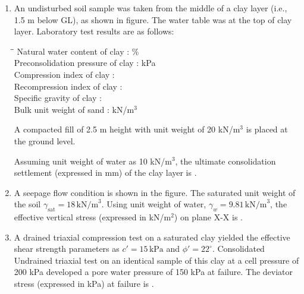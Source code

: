 \documentclass[journal]{IEEEtran}
\begin{document}
\begin{enumerate}[start=40]
\item An undisturbed soil sample was taken from the middle of a clay layer (i.e., 1.5 m below GL), as shown in figure. The water table was at the top of clay layer. Laboratory test results are as follows:\\
\begin{flushleft}
    \begin{tabbing}
        \hspace*{3cm}\=\hspace*{4cm}\=\kill
        Natural water content of clay \> : \% \\
        Preconsolidation pressure of clay \> :  kPa \\
        Compression index of clay \> :  \\
        Recompression index of clay \> :  \\
        Specific gravity of clay \> :  \\
        Bulk unit weight of sand \> :  kN/m$^3$ \\
    \end{tabbing}
\end{flushleft}A compacted fill of 2.5 m height with unit weight of 20 kN/m$^3$ is placed at the ground level.



 Assuming unit weight of water as 10 kN/m$^3$, the ultimate consolidation settlement (expressed in mm) of the clay layer is \underline{\hspace{3cm}}.\\
\item A seepage flow condition is shown in the figure. The saturated unit weight of the soil $\gamma_{\text{sat}} = 18 \, \text{kN/m}^3$. Using unit weight of water, $\gamma_w = 9.81 \, \text{kN/m}^3$, the effective vertical stress (expressed in kN/m$^2$) on plane X-X is \underline{\hspace{2cm}}.\\


\item A drained triaxial compression test on a saturated clay yielded the effective shear strength parameters as $c' = 15 \, \text{kPa}$ and $\phi' = 22^\circ$. Consolidated Undrained triaxial test on an identical sample of this clay at a cell pressure of 200 kPa developed a pore water pressure of 150 kPa at failure. The deviator stress (expressed in kPa) at failure is \underline{\hspace{2cm}}.\\


\end{enumerate}
\end{document}
